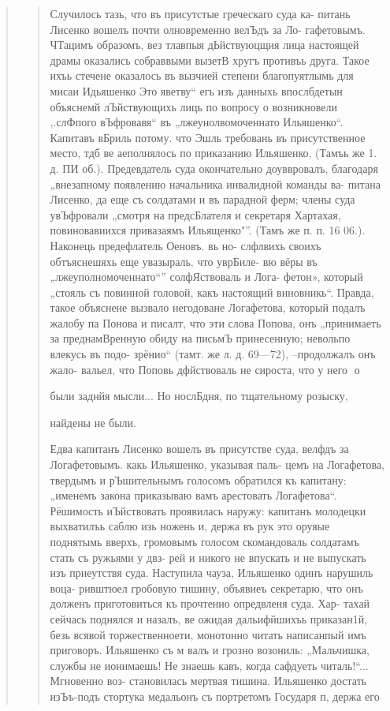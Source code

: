 \begin{quote}
\begin{quote}
Случилось тазь, что въ присутстые греческаго суда ка-
питань Лисенко вошелъ почти олновременно велЪдъ за Ло-
гафетовымъ. ЧТацимъ образомъ, вез тлавпыя дЬйствуюцщия
лица настоящей драмы оказались собраввыми вызетВ хругъ
противъь друга. Такое ихъь стечене оказалось въ вызчией
степени благопуятлымь для мисаи Идьяшенко Это яветву“
егь изъ данныхь впослбдетын объяснемй  лЪйствующихь
лиць по вопросу о возникновели ‚.слФпого вЪфровавя“ въ
„лжеунолвомоченнато Ильяшенко“. Капитавъ вБриль потому.
что Эшль требовань въ присутственное место, тдб ве
аеполнялось по приказанию Ильяшенко, (Тамъь же 1. д. ПИ
об.). Предевдатель суда окончательно доуввровалъ, благодаря
„внезапному появлению начальника инвалидной команды ва-
питана Лисенко, да еще съ солдатами и въ парадной ферм;
члены суда увЪфровали „смотря на предсБлателя и секретаря
Хартахая, повиновавиихся привазаямъ Ильященко"”. (Тамъ
же п. п. 16 06.). Наконець предефлатель Оеновъ. вь но-
слфлвихь своихъ обтъяснешяхь еще увазыраль, что уврБиле-
вю вёры въ „лжеуполномоченнато“” солфЯствоваль и Лога-
фетон», который „стояль съ повинной головой, какъ настоящий
виновникь“. Правда, такое объяснене вызвало негодоване
Логафетова, который подалъ жалобу па Понова и писалт,
что эти слова Попова, онъ „принимаеть за преднамВренную
обиду на письмЪ принесенную; невольпо влекусь въ подо-
зрёнио“ (тамт. же л. д. 69—72), --продолжалъ онъ жало-
вальел, что Поповь дфйствоваль не сироста, что у него
о

были заднйя мысли... Но нослБдня, по тщательному розыску,

найдены не были.

Едва капитанъ Лисенко вошелъ въ присутстве суда,
велфдъ за Логафетовымъ. какь Ильяшенко, указывая паль-
цемъ на Логафетова, твердымъ и рЪшительнымъ голосомъ
обратился къ капитану: „именемъ закона приказываю вамъ
арестовать Логафетова“. Рёшимость иЪйствовать проявилась
наружу: капитанъ молодецки выхватилъь саблю изь ножень
и, держа въ рук это оруяые поднятымь вверхъ, громовымъ
голосом скомандоваль солдатамъ стать съ ружьями у двз-
рей и никого не впускать и не выпускать изъ приеутствя
суда. Наступила чауза, Ильяшенко одинъ нарушиль воца-
ривштюел гробовую тишину, объявиеъ секретарю, что онъ
долженъ приготовиться къ прочтенио опредвленя суда. Хар-
тахай сейчась поднялся и назалъ, ве ожидая дальифйшихъь
приказан1й, безь всявой торжественноети, монотонно читать
написанпый имъ приговоръ. Ильяшенко съ м%
валъ и грозно возониль: „Мальчишка, службы не ионимаешь!
Не знаешь кавъ, когда сафдуеть читаль!“... Мгновенно воз-
становилась мертвая тишина. Ильяшенко достать изЪъ-подъ
стортука медальонъ съ портретомъ Государя п, держа его


\end{quote}
\end{quote}
